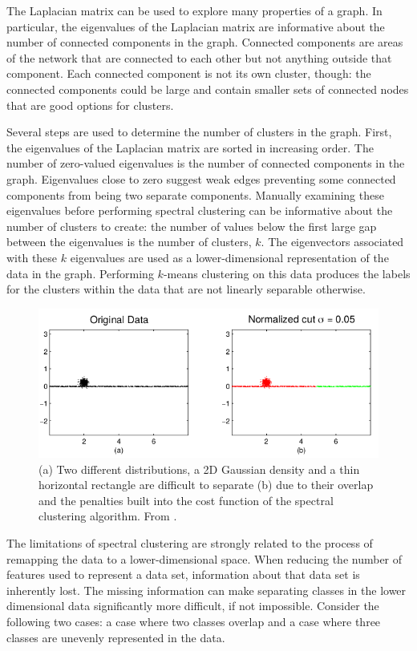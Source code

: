 The Laplacian matrix can be used to explore many properties of a graph. In particular, the eigenvalues of the Laplacian matrix are informative about the number of connected components in the graph. Connected components are areas of the network that are connected to each other but not anything outside that component. Each connected component is not its own cluster, though: the connected components could be large and contain smaller sets of connected nodes that are good options for clusters.

Several steps are used to determine the number of clusters in the graph. First, the eigenvalues of the Laplacian matrix are sorted in increasing order. The number of zero-valued eigenvalues is the number of connected components in the graph. Eigenvalues close to zero suggest weak edges preventing some connected components from being two separate components. Manually examining these eigenvalues before performing spectral clustering can be informative about the number of clusters to create: the number of values below the first large gap between the eigenvalues is the number of clusters, $k$. The eigenvectors associated with these $k$ eigenvalues are used as a lower-dimensional representation of the data in the graph. Performing $k$-means clustering on this data produces the labels for the clusters within the data that are not linearly separable otherwise.

\begin{figure}
\centering
\includegraphics[width=.8\textwidth]{4/spectral_clustering_limitation.png}
\caption{(a) Two different distributions, a 2D Gaussian density and a thin horizontal rectangle are difficult to separate (b) due to their overlap and the penalties built into the cost function of the spectral clustering algorithm. From \cite{Nadler2007}.}
\label{ch4:fig:spect-clust-lim-01}
\vspace{-20pt}
\end{figure}

The limitations of spectral clustering are strongly related to the process of remapping the data to a lower-dimensional space.  When reducing the number of features used to represent a data set, information about that data set is inherently lost. The missing information can make separating classes in the lower dimensional data significantly more difficult, if not impossible. Consider the following two cases: a case where two classes overlap and a case where three classes are unevenly represented in the data.

